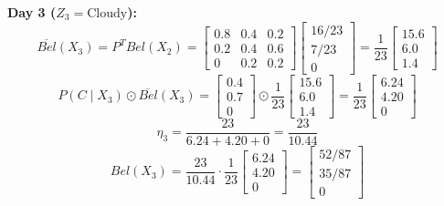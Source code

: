 \documentclass{article}
\begin{document}
\begin{enumerate}
    \textbf{Day 3 ($Z_3 = \text{Cloudy}$):}
    $$ \overline{Bel}(X_3) = P^T Bel(X_2) = \begin{bmatrix} 0.8 & 0.4 & 0.2 \\ 0.2 & 0.4 & 0.6 \\ 0 & 0.2 & 0.2 \end{bmatrix} \begin{bmatrix} 16/23 \\ 7/23 \\ 0 \end{bmatrix} = \frac{1}{23} \begin{bmatrix} 15.6 \\ 6.0 \\ 1.4 \end{bmatrix} $$
    $$ P(C \mid X_3) \odot \overline{Bel}(X_3) = \begin{bmatrix} 0.4 \\ 0.7 \\ 0 \end{bmatrix} \odot \frac{1}{23} \begin{bmatrix} 15.6 \\ 6.0 \\ 1.4 \end{bmatrix} = \frac{1}{23} \begin{bmatrix} 6.24 \\ 4.20 \\ 0 \end{bmatrix} $$
    $$ \eta_3 = \frac{23}{6.24 + 4.20 + 0} = \frac{23}{10.44} $$
    $$ Bel(X_3) = \frac{23}{10.44} \cdot \frac{1}{23} \begin{bmatrix} 6.24 \\ 4.20 \\ 0 \end{bmatrix} = \begin{bmatrix} 52/87 \\ 35/87 \\ 0 \end{bmatrix} $$


\end{enumerate}
\end{document}

